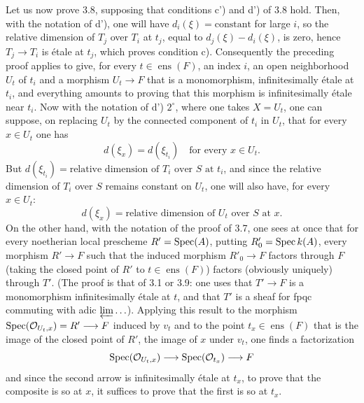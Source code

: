 Let us now prove 3.8, supposing that conditions c') and d') of 3.8 hold. Then, with the notation of d'), one will have $d_i(\xi)=\text{constant}$ for large $i$, so the relative dimension of $T_j$ over $T_i$ at $t_j$, equal to $d_j(\xi)-d_i(\xi)$, is zero, hence $T_j\to T_i$ is étale at $t_j$, which proves condition c). Consequently the preceding proof applies to give, for every $t\in\operatorname{ens}(F)$, an index $i$, an open neighborhood $U_t$ of $t_i$ and a morphism $U_t\to F$ that is a monomorphism, infinitesimally étale at $t_i$, and everything amounts to proving that this morphism is infinitesimally étale near $t_i$. Now with the notation of d') $2^\circ$, where one takes $X=U_t$, one can suppose, on replacing $U_t$ by the connected component of $t_i$ in $U_t$, that for every $x\in U_t$ one has
\[
d(\xi_x)=d(\xi_{t_i})\quad\text{for every }x\in U_t.
\]
But $d(\xi_{t_i})=\text{relative dimension of }T_i\text{ over }S\text{ at }t_i$, and since the relative dimension of $T_i$ over $S$ remains constant on $U_t$, one will also have, for every $x\in U_t$:
\begin{equation}\tag{*}
d(\xi_x)=\text{relative dimension of }U_t\text{ over }S\text{ at }x.
\end{equation}
On the other hand, with the notation of the proof of 3.7, one sees at once that for every noetherian local prescheme $R'=\operatorname{Spec}(A)$, putting $R'_0=\operatorname{Spec} k(A)$, every morphism $R'\to F$ such that the induced morphism $R'_0\to F$ factors through $F$ (\ie taking the closed point of $R'$ to $t\in\operatorname{ens}(F)$) factors (obviously uniquely) through $T'$. (The proof is that of 3.1 or 3.9: one uses that $T'\to F$ is a monomorphism infinitesimally étale at $t$, and that $T'$ is a sheaf for fpqc commuting with adic $\varprojlim\ldots$). Applying this result to the morphism $\operatorname{Spec}(\mathcal{O}_{U_t,x})=R'\longrightarrow F$ induced by $v_t$ and to the point $t_x\in\operatorname{ens}(F)$ that is the image of the closed point of $R'$, \ie the image of $x$ under $v_t$, one finds a factorization
\[
\operatorname{Spec}(\mathcal{O}_{U_t,x})\longrightarrow\operatorname{Spec}(\mathcal{O}_{t_x})\longrightarrow F
\]
and since the second arrow is infinitesimally étale at $t_x$, to prove that the composite is so at $x$, it suffices to prove that the first is so at $t_x$.

